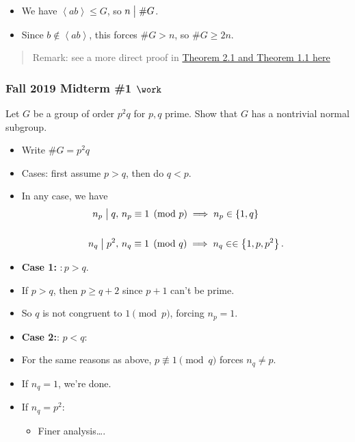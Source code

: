 \begin{solution}
\begin{itemize}
  \begin{itemize}
  \tightlist
  \item
    We have \(\left\langle{ ab }\right\rangle\leq G\), so
    \(n\bigm|\# G\).
  \item
    Since \(b\not\in \left\langle{ ab }\right\rangle\), this forces
    \(\# G > n\), so \(\# G \geq 2n\).
  \end{itemize}
\end{itemize}

\begin{quote}
Remark: see a more direct proof in
\href{https://kconrad.math.uconn.edu/blurbs/grouptheory/dihedral2.pdf}{Theorem
2.1 and Theorem 1.1 here}
\end{quote}

\end{solution}

\hypertarget{fall-2019-midterm-1-work}{%
\subsubsection{\texorpdfstring{Fall 2019 Midterm \#1
\(\work\)}{Fall 2019 Midterm \#1 \textbackslash work}}\label{fall-2019-midterm-1-work}}

Let \(G\) be a group of order \(p^2q\) for \(p, q\) prime. Show that
\(G\) has a nontrivial normal subgroup.

\begin{solution}

\envlist

\begin{itemize}
\item
  Write \(\# G = p^2 q\)
\item
  Cases: first assume \(p>q\), then do \(q<p\).
\item
  In any case, we have
  \begin{align*}
  n_p \bigm|q &,\, n_p \equiv 1 \pmod p \implies n_p \in \left\{{ 1,q }\right\} \\ \\
  n_q \bigm|p^2 &,\, n_q \equiv 1 \pmod q \implies n_q \in \in \left\{{ 1, p, p^2}\right\} 
  .\end{align*}
\item
  \textbf{Case 1:} \(:p>q\).
\item
  If \(p>q\), then \(p\geq q+2\) since \(p+1\) can't be prime.
\item
  So \(q\) is not congruent to \(1\pmod p\), forcing \(n_p = 1\).
\item
  \textbf{Case 2:}: \(p< q\):
\item
  For the same reasons as above, \(p\not\equiv 1\pmod q\) forces
  \(n_q\neq p\).
\item
  If \(n_q = 1\), we're done.
\item
  If \(n_q = p^2\):

  \begin{itemize}
  \tightlist
  \item
    Finer analysis\ldots.
  \end{itemize}
\end{itemize}

\end{solution}

